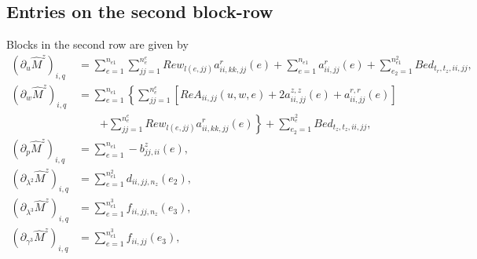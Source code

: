 \documentclass{article}
\begin{document}
\subsection{Entries on the second block-row}
Blocks in the second row are given by
\begin{align}
\left(\partial_u \hat{M}^z\right)_{i,q} &= \sum_{e=1}^{n_{e1}} \sum_{jj=1}^{n_e^e} Re w_{l(e,jj)} a_{ii,kk,jj}^r(e) + \sum_{e=1}^{n_{e1}} a_{ii,jj}^r(e) + \sum_{e_2=1}^{n_{e1}^2} Be d_{t_r,t_z,ii,jj}, \tag{18.9}\\
\left(\partial_w \hat{M}^z\right)_{i,q} &= \sum_{e=1}^{n_{e1}} \left\{ \sum_{jj=1}^{n_e^e} \left[ Re A_{ii,jj}(u,w,e) + 2a_{ii,jj}^{z,z}(e) + a_{ii,jj}^{r,r}(e) \right] \right. \nonumber\\
&\qquad \left. + \sum_{jj=1}^{n_e^e} Re w_{l(e,jj)} a_{ii,kk,jj}^r(e) \right\} + \sum_{e_2=1}^{n_e^2} Be d_{t_z,t_z,ii,jj}, \tag{18.10}\\
\left(\partial_p \hat{M}^z\right)_{i,q} &= \sum_{e=1}^{n_{e1}} -b_{jj,ii}^z(e), \tag{18.11}\\
\left(\partial_{\lambda^2} \hat{M}^z\right)_{i,q} &= \sum_{e=1}^{n_{e1}^2} d_{ii,jj,n_z}(e_2), \tag{18.12}\\
\left(\partial_{\lambda^3} \hat{M}^z\right)_{i,q} &= \sum_{e=1}^{n_{e1}^3} f_{ii,jj,n_z}(e_3), \tag{18.13}\\
\left(\partial_{\gamma^3} \hat{M}^z\right)_{i,q} &= \sum_{e=1}^{n_{e1}^3} f_{ii,jj}(e_3), \tag{18.14}
\end{align}
\end{document}
